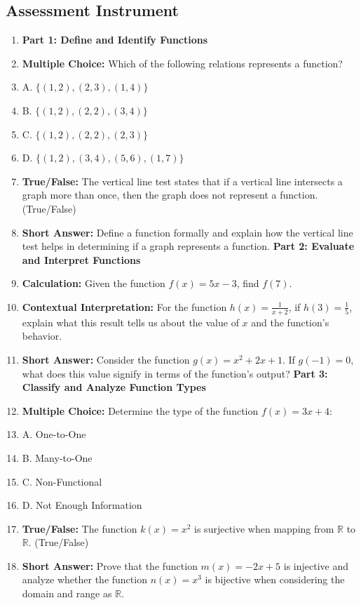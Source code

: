 \subsection{Assessment Instrument}

\begin{enumerate}
    \item \textbf{Part 1: Define and Identify Functions}
    \item \textbf{Multiple Choice:} Which of the following relations represents a function?
    \item A. $\{(1, 2), (2, 3), (1, 4)\}$
    \item B. $\{(1, 2), (2, 2), (3, 4)\}$
    \item C. $\{(1, 2), (2, 2), (2, 3)\}$
    \item D. $\{(1, 2), (3, 4), (5, 6), (1, 7)\}$
    \item \textbf{True/False:} The vertical line test states that if a vertical line intersects a graph more than once, then the graph does not represent a function. (True/False)
    \item \textbf{Short Answer:} Define a function formally and explain how the vertical line test helps in determining if a graph represents a function. \textbf{Part 2: Evaluate and Interpret Functions}
    \item \textbf{Calculation:} Given the function $f(x) = 5x - 3$, find $f(7)$.
    \item \textbf{Contextual Interpretation:} For the function $h(x) = \frac{1}{x + 2}$, if $h(3) = \frac{1}{5}$, explain what this result tells us about the value of $x$ and the function's behavior.
    \item \textbf{Short Answer:} Consider the function $g(x) = x^2 + 2x + 1$. If $g(-1) = 0$, what does this value signify in terms of the function’s output? \textbf{Part 3: Classify and Analyze Function Types}
    \item \textbf{Multiple Choice:} Determine the type of the function $f(x) = 3x + 4$:
    \item A. One-to-One
    \item B. Many-to-One
    \item C. Non-Functional
    \item D. Not Enough Information
    \item \textbf{True/False:} The function $k(x) = x^2$ is surjective when mapping from $\mathbb{R}$ to $\mathbb{R}$. (True/False)
    \item \textbf{Short Answer:} Prove that the function $m(x) = -2x + 5$ is injective and analyze whether the function $n(x) = x^3$ is bijective when considering the domain and range as $\mathbb{R}$.
\end{enumerate}


